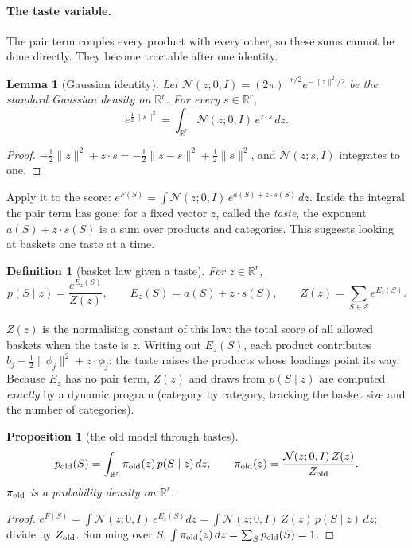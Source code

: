 \documentclass[11pt,a4paper]{article}
\newtheorem{proposition}{Proposition}
\newtheorem{lemma}{Lemma}
\newtheorem{definition}{Definition}
\newcommand{\N}{\mathcal N}
\newcommand{\R}{\mathbb R}
\begin{document}
\paragraph{The taste variable.} The pair term couples every product with every other, so these sums cannot be
done directly. They become tractable after one identity.

\begin{lemma}[Gaussian identity]\label{lem:gauss}
Let $\N(z;0,I)=(2\pi)^{-r/2}e^{-\lVert z\rVert^2/2}$ be the standard Gaussian density on $\R^r$. For every $s\in\R^r$,
\[
e^{\frac12\lVert s\rVert^2}=\int_{\R^r}\N(z;0,I)\,e^{z\cdot s}\,dz .
\]
\end{lemma}
\begin{proof}
$-\tfrac12\lVert z\rVert^2+z\cdot s=-\tfrac12\lVert z-s\rVert^2+\tfrac12\lVert s\rVert^2$, and $\N(z;s,I)$ integrates to one.
\end{proof}

Apply it to the score: $e^{F(S)}=\int\N(z;0,I)\,e^{a(S)+z\cdot s(S)}\,dz$. Inside the integral the pair term has
gone; for a fixed vector $z$, called the \emph{taste}, the exponent $a(S)+z\cdot s(S)$ is a sum over products and
categories. This suggests looking at baskets one taste at a time.

\begin{definition}[basket law given a taste]
For $z\in\R^r$,
\begin{equation}
p(S\mid z)=\frac{e^{E_z(S)}}{Z(z)},\qquad E_z(S)=a(S)+z\cdot s(S),\qquad Z(z)=\sum_{S\in\mathcal S}e^{E_z(S)} .
\label{eq:cond}
\end{equation}
\end{definition}
$Z(z)$ is the normalising constant of this law: the total score of all allowed baskets when the taste is $z$.
Writing out $E_z(S)$, each product contributes $b_j-\tfrac12\lVert\phi_j\rVert^2+z\cdot\phi_j$: the taste raises the
products whose loadings point its way. Because $E_z$ has no pair term, $Z(z)$ and draws from $p(S\mid z)$ are
computed \emph{exactly} by a dynamic program (category by category, tracking the basket size and the number of
categories).

\begin{proposition}[the old model through tastes]\label{prop:oldmix}
\begin{equation}
p_{\rm old}(S)=\int_{\R^r}\pi_{\rm old}(z)\,p(S\mid z)\,dz,\qquad
\pi_{\rm old}(z)=\frac{\N(z;0,I)\,Z(z)}{Z_{\rm old}} .
\label{eq:oldmix}
\end{equation}
$\pi_{\rm old}$ is a probability density on $\R^r$.
\end{proposition}
\begin{proof}
$e^{F(S)}=\int\N(z;0,I)\,e^{E_z(S)}dz=\int\N(z;0,I)\,Z(z)\,p(S\mid z)\,dz$; divide by $Z_{\rm old}$. Summing over $S$,
$\int\pi_{\rm old}(z)\,dz=\sum_Sp_{\rm old}(S)=1$.
\end{proof}
\end{document}
